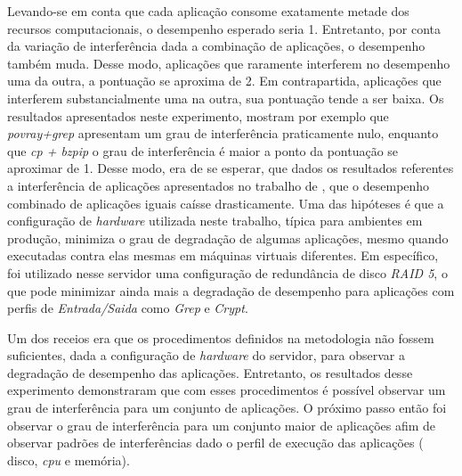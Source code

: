 Levando-se em conta que cada aplicação consome exatamente metade dos recursos computacionais, o desempenho esperado seria 1. Entretanto, por conta da variação de interferência dada a combinação de aplicações, o desempenho também muda. Desse modo, aplicações que raramente interferem no desempenho uma da outra, a pontuação se aproxima de 2. Em contrapartida, aplicações que interferem substancialmente uma na outra, sua pontuação tende a ser baixa. Os resultados apresentados neste experimento, mostram por exemplo que \textit{povray+grep} apresentam um grau de interferência praticamente nulo, enquanto que \textit{cp + bzpip} o grau de interferência é maior a ponto da pontuação se aproximar de 1. Desse modo, era de se esperar, que dados os resultados referentes a interferência de aplicações apresentados no trabalho de , que o desempenho combinado de aplicações iguais caísse drasticamente. Uma das hipóteses é que a configuração de \textit{hardware} utilizada neste trabalho, típica para ambientes em produção, minimiza o grau de degradação de algumas aplicações, mesmo quando executadas contra elas mesmas em máquinas virtuais diferentes. Em específico, foi utilizado nesse servidor uma configuração de redundância de disco \textit{RAID 5}, o que pode minimizar ainda mais a degradação de desempenho para aplicações com perfis de \textit{Entrada/Saida} como \textit{Grep} e \textit{Crypt}.


Um dos receios era que os procedimentos definidos na metodologia não fossem suficientes, dada a configuração de \textit{hardware} do servidor, para observar a degradação de desempenho das aplicações. Entretanto, os resultados desse experimento demonstraram que com esses procedimentos é possível observar um grau de interferência para um conjunto de aplicações. O próximo passo então foi observar o grau de interferência para um conjunto maior de aplicações afim de observar padrões de interferências dado o perfil de execução das aplicações ( disco, \textit{cpu} e memória).

